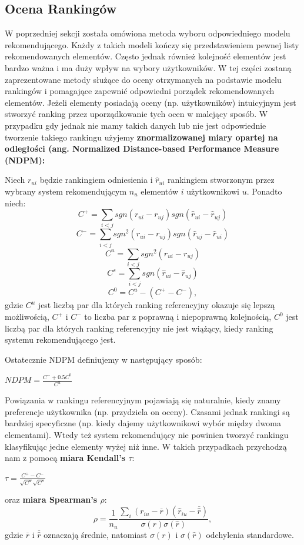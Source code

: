 \documentclass[12pt,a4paper]{report}
\begin{document}
\subsection{Ocena Rankingów}
W poprzedniej sekcji została omówiona metoda wyboru odpowiedniego modelu rekomendującego. Każdy z takich modeli kończy się przedstawieniem pewnej listy rekomendowanych elementów. Często jednak również kolejność elementów jest bardzo ważna i ma duży wpływ na wybory użytkowników.
W tej części zostaną zaprezentowane metody służące do oceny otrzymanych na podstawie modelu rankingów i pomagające zapewnić odpowiedni porządek rekomendowanych elementów. Jeżeli elementy posiadają oceny (np. użytkowników) intuicyjnym jest stworzyć ranking przez uporządkowanie tych ocen w malejący sposób. W przypadku gdy jednak nie mamy takich danych lub nie jest odpowiednie tworzenie takiego rankingu użyjemy \textbf{znormalizowanej miary opartej na odległości (ang. Normalized Distance-based Performance Measure (NDPM): }

Niech $r_{ui}$ będzie rankingiem odniesienia i $\widehat{r}_{ui}$ rankingiem stworzonym przez wybrany system rekomendującym $n_u$ elementów $i$ użytkownikowi $u$. 
Ponadto niech:
$$C^{+} = \sum_{i<j} sgn(r_{ui} - r_{uj})sgn(\widehat{r}_{ui}-\widehat{r}_{uj})$$
$$C^{-} = \sum_{i<j} sgn^{2}(r_{ui} - r_{uj})sgn(\widehat{r}_{uj}-\widehat{r}_{ui})$$
$$C^{u} = \sum_{i<j} sgn^{2}(r_{ui} - r_{uj})$$
$$C^{s} = \sum_{i<j} sgn(\widehat{r}_{ui}-\widehat{r}_{uj})$$
$$C^{0}=C^{u}-(C^{+}-C^{-}),$$ gdzie
$C^{u}$ jest liczbą par dla których ranking referencyjny okazuje się lepszą możliwością, 
$C^{+}$ i $C^{-}$ to liczba par z poprawną i niepoprawną kolejnością,
$C^{0}$ jest liczbą par dla których ranking referencyjny nie jest wiążący, kiedy ranking systemu rekomendującego jest.

Ostatecznie NDPM definiujemy w następujący sposób:
\begin{center}
$NDPM = \frac{C^{-} + 0.5 C^{0}}{C^{u}}$
\end{center}
Powiązania w rankingu referencyjnym pojawiają się naturalnie, kiedy znamy preferencje użytkownika (np. przydziela on oceny). Czasami jednak rankingi są bardziej specyficzne (np. kiedy dajemy użytkownikowi wybór między dwoma elementami). Wtedy też system rekomendujący nie powinien tworzyć rankingu klasyfikując jedne elementy wyżej niż inne. W takich przypadkach przychodzą nam z pomocą 
\textbf{miara Kendall's $\tau$}:
\begin{center}
$\tau = \frac{C^{+} - C^{-} }{\sqrt{C^{u}}\sqrt{C^{s}}}$
\end{center}
oraz \textbf{miara Spearman's $\rho$}:
$$\rho = \frac{1}{n_{u}}\frac{\sum_i (r_{iu} - \overline{r})(\widehat{r}_{iu}-\overline{\widehat{r}})}{\sigma(r)\sigma(\widehat{r})},$$
gdzie $\overline{r}$ i $\overline{\widehat{r}}$ oznaczają średnie, natomiast $\sigma(r)$ i $\sigma(\widehat{r})$ odchylenia standardowe.
\end{document}
